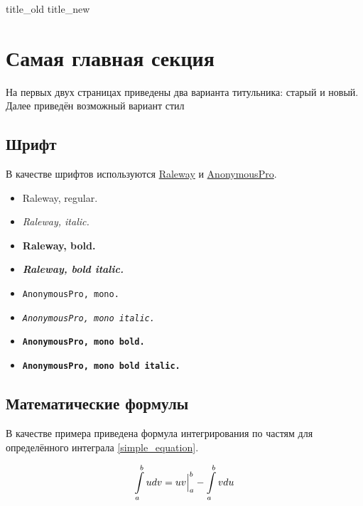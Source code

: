 \documentclass[12pt,a4paper]{article}
\begin{document}
{title_old} %
{title_new} %

\tableofcontents %

\section{Самая главная секция}

На первых двух страницах приведены два варианта титульника: старый и новый. Далее приведён возможный вариант стил


\subsection{Шрифт}

В качестве шрифтов используются \href{https://fonts.google.com/specimen/Raleway}{Raleway} и \href{https://fonts.google.com/specimen/Anonymous+Pro}{AnonymousPro}.

\begin{multicols}{2}
	\begin{itemize}
		\item Raleway, regular.
		\item \textit{Raleway, italic.}
		\item \textbf{Raleway, bold.}
		\item \textbf{\textit{Raleway, bold italic.}}
		\item \texttt{AnonymousPro, mono.}
		\item \textit{\texttt{AnonymousPro, mono italic.}}
		\item \textbf{\texttt{AnonymousPro, mono bold.}}
		\item \textbf{\texttt{AnonymousPro, mono bold italic.}}
	\end{itemize}
\end{multicols}


\subsection{Математические формулы}


В качестве примера приведена формула интегрирования по частям для определённого интеграла \eqref{simple_equation}.

\begin{equation} \label{simple_equation}
\displaystyle\int\limits_a^b u dv = uv \Big|_a^b - \displaystyle\int\limits_a^b v du
\end{equation}
\end{document}
